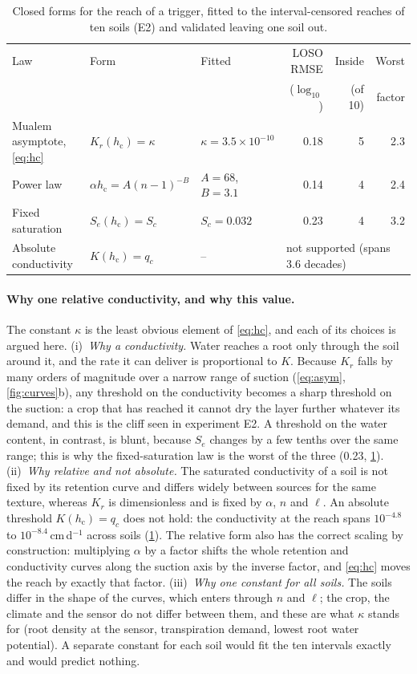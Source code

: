 \documentclass[preprint,12pt,authoryear]{elsarticle}
\newcommand{\hc}{h_{\mathrm{c}}}
\begin{document}
\begin{table}[H]\centering\small
\caption{Closed forms for the reach of a trigger, fitted to the interval-censored reaches of ten soils (E2) and validated leaving one soil out.}
\label{tab:laws}
\footnotesize\begin{tabular}{@{}lllrrr@{}}
\toprule
Law & Form & Fitted & LOSO RMSE & Inside & Worst\\
 & & & ($\log_{10}$) & (of 10) & factor\\\midrule
Mualem asymptote, \cref{eq:hc} & $K_r(\hc)=\kappa$ & $\kappa=3.5\times10^{-10}$ & 0.18 & 5 & 2.3\\
Power law & $\alpha\hc=A(n-1)^{-B}$ & $A=68$, $B=3.1$ & 0.14 & 4 & 2.4\\
Fixed saturation & $S_e(\hc)=S_c$ & $S_c=0.032$ & 0.23 & 4 & 3.2\\
Absolute conductivity & $K(\hc)=q_c$ & -- & \multicolumn{3}{l}{not supported (spans 3.6 decades)}\\\bottomrule
\end{tabular}
\end{table}

\paragraph{Why one relative conductivity, and why this value.}
The constant $\kappa$ is the least obvious element of \cref{eq:hc}, and each of its choices is argued here. (i)~\emph{Why a conductivity.} Water reaches a root only through the soil around it, and the rate it can deliver is proportional to $K$. Because $K_r$ falls by many orders of magnitude over a narrow range of suction (\cref{eq:asym}, \cref{fig:curves}b), any threshold on the conductivity becomes a sharp threshold on the suction: a crop that has reached it cannot dry the layer further whatever its demand, and this is the cliff seen in experiment E2. A threshold on the water content, in contrast, is blunt, because $S_e$ changes by a few tenths over the same range; this is why the fixed-saturation law is the worst of the three (0.23, \cref{tab:laws}). (ii)~\emph{Why relative and not absolute.} The saturated conductivity of a soil is not fixed by its retention curve and differs widely between sources for the same texture, whereas $K_r$ is dimensionless and is fixed by $\alpha$, $n$ and $\ell$. An absolute threshold $K(\hc)=q_c$ does not hold: the conductivity at the reach spans $10^{-4.8}$ to $10^{-8.4}$\,cm\,d$^{-1}$ across soils (\cref{tab:laws}). The relative form also has the correct scaling by construction: multiplying $\alpha$ by a factor shifts the whole retention and conductivity curves along the suction axis by the inverse factor, and \cref{eq:hc} moves the reach by exactly that factor. (iii)~\emph{Why one constant for all soils.} The soils differ in the shape of the curves, which enters through $n$ and $\ell$; the crop, the climate and the sensor do not differ between them, and these are what $\kappa$ stands for (root density at the sensor, transpiration demand, lowest root water potential). A separate constant for each soil would fit the ten intervals exactly and would predict nothing.
\end{document}

